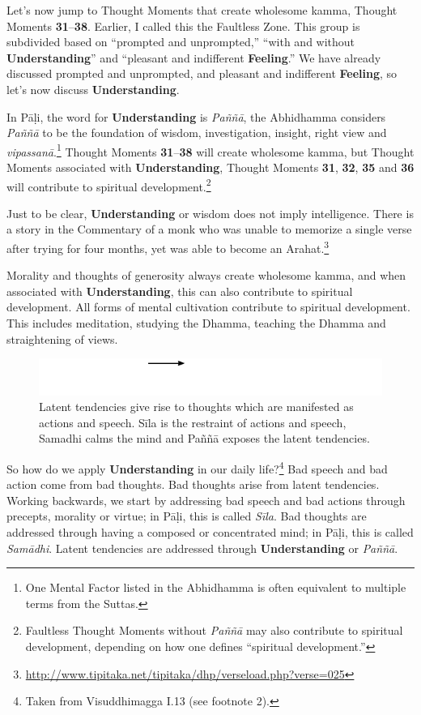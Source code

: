 Let’s now jump to Thought Moments that create wholesome kamma, Thought Moments \textbf{31}--\textbf{38}. Earlier, I called this the Faultless Zone. This group is subdivided based on “prompted and unprompted,” “with and without \textbf{Understanding}” and “pleasant and indifferent \textbf{Feeling}.” We have already discussed prompted and unprompted, and pleasant and indifferent \textbf{Feeling}, so let’s now discuss \textbf{Understanding}.

In Pāḷi, the word for \textbf{Understanding} is \textit{Paññā}, the Abhidhamma considers \textit{Paññā} to be the foundation of wisdom, investigation, insight, right view and \textit{vipassanā}.\footnote{One Mental Factor listed in the Abhidhamma is often equivalent to multiple terms from the Suttas.} Thought Moments \textbf{31}--\textbf{38} will create wholesome kamma, but Thought Moments associated with \textbf{Understanding}, Thought Moments \textbf{31}, \textbf{32}, \textbf{35} and \textbf{36} will contribute to spiritual development.\footnote{Faultless Thought Moments without \textit{Paññā} may also contribute to spiritual development, depending on how one defines “spiritual development.”}

Just to be clear, \textbf{Understanding} or wisdom does not imply intelligence. There is a story in the Commentary of a monk who was unable to memorize a single verse after trying for four months, yet was able to become an Arahat.\footnote{\url{http://www.tipitaka.net/tipitaka/dhp/verseload.php?verse=025}}

Morality and thoughts of generosity always create wholesome kamma, and when associated with \textbf{Understanding}, this can also contribute to spiritual development. All forms of mental cultivation contribute to spiritual development. This includes meditation, studying the Dhamma, teaching the Dhamma and straightening of views.

\begin{figure}[h]
\centering
\includegraphics[width=0.6\linewidth]{./Diagrams/Sila}
\caption{Latent tendencies give rise to thoughts which are manifested as actions and speech. Sīla is the restraint of actions and speech, Samadhi calms the mind and Paññā exposes the latent tendencies.}
\label{fig:Sila}
\end{figure}

So how do we apply \textbf{Understanding} in our daily life?\footnote{Taken from Visuddhimagga I.13 (see footnote 2).} Bad speech and bad action come from bad thoughts. Bad thoughts arise from latent tendencies. Working backwards, we start by addressing bad speech and bad actions through precepts, morality or virtue; in Pāḷi, this is called \textit{Sīla}. Bad thoughts are addressed through having a composed or concentrated mind; in Pāḷi, this is called \textit{Samādhi}. Latent tendencies are addressed through \textbf{Understanding} or \textit{Paññā}.

